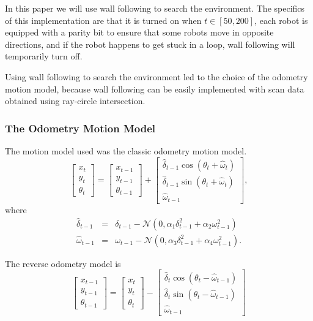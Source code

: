 In this paper we will use wall following to search the environment.  The specifics of this implementation are that it is turned on when $t\in[50,200]$, each robot is equipped with a parity bit to ensure that some robots move in opposite directions, and if the robot happens to get stuck in a loop, wall following will temporarily turn off.

Using wall following to search the environment led to the choice of the odometry motion model, because wall following can be easily implemented with scan data obtained using ray-circle intersection.


\subsubsection{The Odometry Motion Model}

The motion model used was the classic odometry motion model.  
\begin{equation}
\begin{bmatrix}
x_{t}\\
y_{t}\\
\theta_{t}
\end{bmatrix}=\begin{bmatrix}
x_{t-1}\\
y_{t-1}\\
\theta_{t-1}
\end{bmatrix}+\begin{bmatrix}
\hat{\delta}_{t-1}  \cos(\theta_t+\hat{\omega}_t)\\
\hat{\delta}_{t-1}\sin(\theta_t+\hat{\omega}_t)\\
\hat{\omega}_{t-1}
\end{bmatrix},
\label{eq:OdometryMotion}
\end{equation}
where
\begin{eqnarray}
\hat{\delta}_{t-1}&=&\delta_{t-1}-\mathcal{N}(0,\alpha_1\delta_{t-1}^2+\alpha_2\omega_{t-1}^2)\\
\hat{\omega}_{t-1}&=&\omega_{t-1}-\mathcal{N}(0,\alpha_3\delta_{t-1}^2+\alpha_4\omega_{t-1}^2).
\end{eqnarray}

The reverse odometry model is
\begin{equation}
\begin{bmatrix}
x_{t-1}\\
y_{t-1}\\
\theta_{t-1}
\end{bmatrix}=\begin{bmatrix}
x_{t}\\
y_{t}\\
\theta_{t}
\end{bmatrix}-\begin{bmatrix}
\hat{\delta}_t  \cos(\theta_t-\hat{\omega}_{t-1})\\
\hat{\delta}_{t}\sin(\theta_t-\hat{\omega}_{t-1})\\
\hat{\omega}_{t-1}
\end{bmatrix}
\label{eq:ReverseOdometryMotion}
\end{equation}

